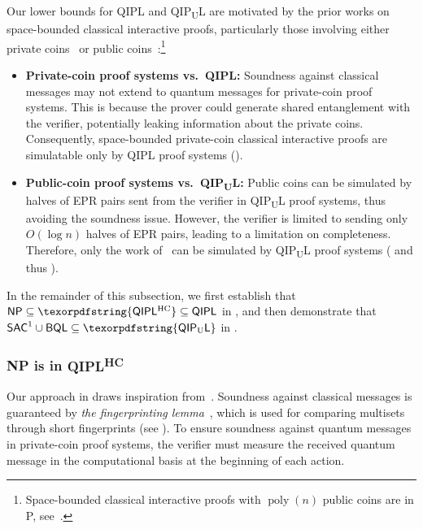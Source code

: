 \documentclass[10pt,a4paper]{article}
\numberwithin{equation}{section}
\numberwithin{figure}{section}
\newcommand{\Ptime}{\textnormal{\textsf{P}}\xspace}
\newcommand{\NP}{\textnormal{\textsf{NP}}\xspace}
\newcommand{\QIPL}{\textnormal{\textsf{QIPL}}\xspace}
\newcommand{\QIPUL}{\texorpdfstring{\textnormal{\textsf{QIP}\textsubscript{\textnormal{U}}\textsf{L}}}\xspace}
\newcommand{\QIPLHC}{\texorpdfstring{\textnormal{\textsf{QIPL}\textsuperscript{\textnormal{HC}}}}\xspace}
\newcommand{\BQL}{\textnormal{\textsf{BQL}}\xspace}
\newcommand{\SAC}{\textnormal{\textsf{SAC}}\xspace}
\DeclareMathOperator\poly{poly}
\begin{document}
Our lower bounds for \QIPL{} and \QIPUL{} are motivated by the prior works on space-bounded classical interactive proofs, particularly those involving either private coins~\cite{CL95} or public coins~\cite{Fortnow89,FL93,Condon92survey, GKR15, CR23}:\footnote{Space-bounded classical interactive proofs with $\poly(n)$ public coins are in \Ptime{}, see~\cite[Theorem 6]{Condon92survey}.}
\begin{itemize}[itemsep=0.33em,topsep=0.33em,parsep=0.33em]
    \item \textbf{Private-coin proof systems vs.~\QIPL{}:} Soundness against classical messages may not extend to quantum messages for private-coin proof systems. This is because the prover could generate shared entanglement with the verifier, potentially leaking information about the private coins. Consequently, space-bounded private-coin classical interactive proofs are simulatable only by \QIPL{} proof systems (). 
    \item \textbf{Public-coin proof systems vs.~\QIPUL{}:} Public coins can be simulated by halves of EPR pairs sent from the verifier in \QIPUL{} proof systems, thus avoiding the soundness issue. However, the verifier is limited to sending only $O(\log{n})$ halves of EPR pairs, leading to a limitation on completeness. Therefore, only the work of~\cite{Fortnow89} can be simulated by \QIPUL{} proof systems ( and thus ). 
\end{itemize}

In the remainder of this subsection, we first establish that $\NP \subseteq \QIPLHC \subseteq \QIPL$ in , and then demonstrate that $\SAC^1 \cup \BQL \subseteq \QIPUL$ in . 

\subsubsection{\NP{} is in \QIPLHC{}}
\label{subsubsec:NP-in-QIPL}

Our approach in  draws inspiration from~\cite[Lemma 2]{CL95}.
Soundness against classical messages is guaranteed by \textit{the fingerprinting lemma}~\cite{Lipton90}, which is used for comparing multisets through short fingerprints (see ). 
To ensure soundness against quantum messages in private-coin proof systems, the verifier must measure the received quantum message in the computational basis at the beginning of each action. 
\end{document}
